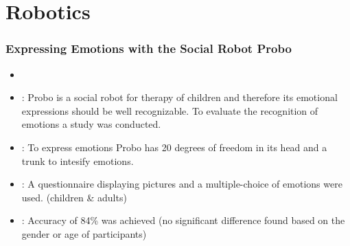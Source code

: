 \documentclass[compress,english]{beamer}
\author{Felix Bühler}
\begin{document}
\section{Robotics}

\begin{frame}
	\frametitle{Expressing Emotions with the Social Robot Probo}
	\begin{itemize}
		\item {\footnotesize {}}
		\item {}:
		Probo is a social robot for therapy of children and therefore its emotional expressions should be well recognizable. To evaluate the recognition of emotions a study was conducted.
		\item {}: To express emotions Probo has 20 degrees of freedom in its head and a trunk to intesify emotions.
		\item {}: A questionnaire displaying pictures and a
		multiple-choice of emotions were used. (children \& adults)
		\item {}: Accuracy of 84\% was achieved (no significant difference
found based on the gender or age of participants)
	\end{itemize}
\end{frame}
\end{document}
